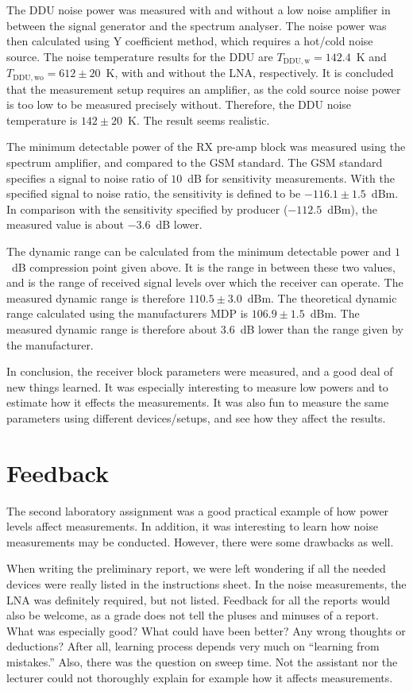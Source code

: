 \documentclass[a4paper, 12pt]{article}
\begin{document}
The DDU noise power was measured with and without a low noise amplifier in between the signal 
generator and the spectrum analyser. The noise power was then calculated using Y coefficient
 method, which requires a hot/cold noise source. The noise temperature results for the DDU are 
 $T_\mathrm{DDU, w} = 142.4$~K and $T_\mathrm{DDU, wo} = 612 \pm 20$~K, with and without the 
 LNA, respectively. It is concluded that the measurement setup requires an amplifier, as the 
 cold source noise power is too low to be measured precisely without. Therefore, the DDU noise 
 temperature is $142 \pm 20$~K. The result seems realistic.

The minimum detectable power of the RX pre-amp block was measured using the spectrum amplifier, 
and compared to the GSM standard. The GSM standard specifies a signal to noise ratio of $10$~dB 
for sensitivity measurements. With the specified signal to noise ratio, the sensitivity is 
defined to be $-116.1 \pm 1.5$~dBm. In comparison with the sensitivity specified by producer 
($-112.5$~dBm), the measured value is about $-3.6$~dB lower.

The dynamic range can be calculated from the minimum detectable power and $1$~dB compression 
point given above. It is the range in between these two values, and is the range of received 
signal levels over which the receiver can operate. The measured dynamic range is therefore 
$110.5 \pm 3.0$~dBm. The theoretical dynamic range calculated using the manufacturers MDP is 
$106.9 \pm 1.5$~dBm. The measured dynamic range is therefore about 3.6~dB lower than the 
range given by the manufacturer.

In conclusion, the receiver block parameters were measured, and a good deal of new things 
learned. It was especially interesting to measure low powers and to estimate how it effects 
the measurements. It was also fun to measure the same parameters using different devices/setups, 
and see how they affect the results.

\newpage
\section{Feedback}

The second laboratory assignment was a good practical example of how power levels affect 
measurements. In addition, it was interesting to learn how noise measurements may be conducted. 
However, there were some drawbacks as well.

When writing the preliminary report, we were left wondering if all the needed devices were 
really listed in the instructions sheet. In the noise measurements, the LNA was definitely 
required, but not listed. Feedback for all the reports would also be welcome, as a grade 
does not tell the pluses and minuses of a report. What was especially good? What could have 
been better? Any wrong thoughts or deductions? After all, learning process depends very much 
on ``learning from mistakes.'' Also, there was the question on sweep time. Not the assistant 
nor the lecturer could not thoroughly explain for example how it affects measurements.
\end{document}

